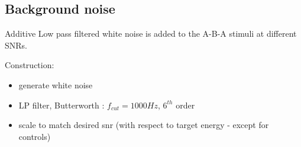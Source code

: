 \documentclass[11pt,a4paper,oneside]{article}
\begin{document}
\subsection{Background noise}

Additive Low pass filtered white noise is added to the A-B-A stimuli at different SNRs.

Construction:
\begin{itemize}
\item generate white noise
\item LP filter, Butterworth : $f_{cut} = 1000 Hz$, $6^{th}$ order
\item scale to match desired snr (with respect to target energy - except for controls)
\end{itemize}
\end{document}
